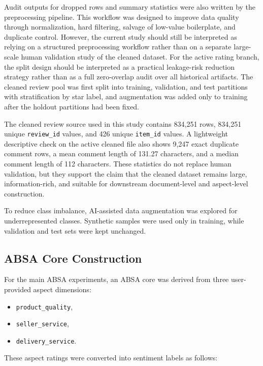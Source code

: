 \documentclass[a4paper,12pt]{extarticle}
\begin{document}
Audit outputs for dropped rows and summary statistics were also written by the preprocessing pipeline. This workflow was designed to improve data quality through normalization, hard filtering, salvage of low-value boilerplate, and duplicate control. However, the current study should still be interpreted as relying on a structured preprocessing workflow rather than on a separate large-scale human validation study of the cleaned dataset. For the active rating branch, the split design should be interpreted as a practical leakage-risk reduction strategy rather than as a full zero-overlap audit over all historical artifacts. The cleaned review pool was first split into training, validation, and test partitions with stratification by star label, and augmentation was added only to training after the holdout partitions had been fixed.



The cleaned review source used in this study contains 834{,}251 rows, 834{,}251 unique \texttt{review\_id} values, and 426 unique \texttt{item\_id} values. A lightweight descriptive check on the active cleaned file also shows 9{,}247 exact duplicate comment rows, a mean comment length of 131.27 characters, and a median comment length of 112 characters. These statistics do not replace human validation, but they support the claim that the cleaned dataset remains large, information-rich, and suitable for downstream document-level and aspect-level construction.


To reduce class imbalance, AI-assisted data augmentation was explored for underrepresented classes. Synthetic samples were used only in training, while validation and test sets were kept unchanged.

\subsection{ABSA Core Construction}

For the main ABSA experiments, an ABSA core was derived from three user-provided aspect dimensions:

\begin{itemize}[leftmargin=1.5em]
\item \texttt{product\_quality},
\item \texttt{seller\_service},
\item \texttt{delivery\_service}.
\end{itemize}

These aspect ratings were converted into sentiment labels as follows:
\end{document}
